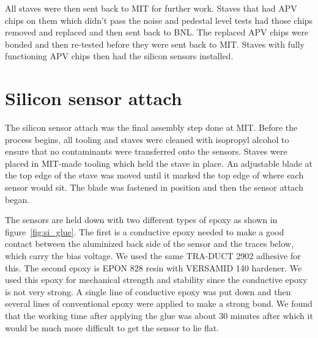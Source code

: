 \documentclass[preprint,12pt]{elsarticle}
\begin{document}
All staves were then sent back to MIT for further work. Staves that had APV
chips on them which didn’t pass the noise and pedestal level tests had
those chips removed and replaced and then sent back to BNL. The replaced APV
chips were bonded and then re-tested before they were sent back to MIT. Staves
with fully functioning APV chips then had the silicon sensors installed.

\section{Silicon sensor attach}
The silicon sensor attach was the final assembly step done at MIT. Before the
process begins, all tooling and staves were cleaned with isopropyl alcohol to
ensure that no contaminants were transferred onto the sensors. Staves were placed
in MIT-made tooling which held the stave in place. An adjustable blade at the
top edge of the stave was moved until it marked the top edge of where each sensor
would sit. The blade was fastened in position and then the sensor attach
began.

The sensors are held down with two different types of epoxy as shown in figure~\ref{fig:si_glue}. The first is a
conductive epoxy needed to make a good contact between the aluminized back side
of the sensor and the traces below, which carry the bias voltage. We used the
same TRA-DUCT 2902 adhesive for this. The second epoxy is EPON 828 resin with
VERSAMID 140 hardener. We used this epoxy for mechanical strength and stability since the
conductive epoxy is not very strong. A single line of conductive epoxy was put
down and then several lines of conventional epoxy were applied to make a strong
bond. We found that the working time after applying the glue was about 30
minutes after which it would be much more difficult to get the sensor to lie
flat.
\end{document}
